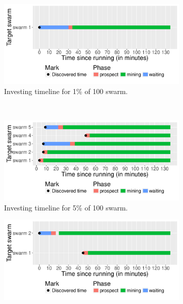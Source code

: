 \begin{figure}[th]
	\begin{adjustwidth}{-1.5cm}{}
	\begin{subfigure}[t]{0.6\textwidth}
		\centering
		\includegraphics[width=\textwidth]{pics/results/time-1p100s.pdf}
		\caption{Investing timeline for 1\% of 100 swarm.}
		\label{fig:time1p100s}
	\end{subfigure}
	~
	\begin{subfigure}[t]{0.6\textwidth}
		\centering
		\includegraphics[width=\textwidth]{pics/results/time-5p100s.pdf}
		\caption{Investing timeline for 5\% of 100 swarm.}
		\label{fig:time5p100s}
	\end{subfigure}
	\begin{subfigure}[t]{0.6\textwidth}
		\centering
		\includegraphics[width=\textwidth]{pics/results/time-1p200s.pdf}

\end{subfigure}
\end{adjustwidth}
\end{figure}
